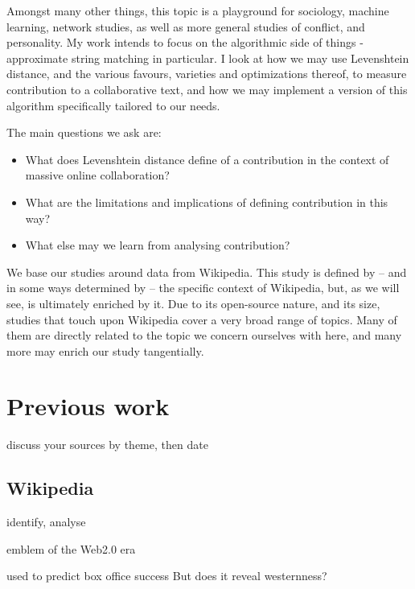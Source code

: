 \documentclass[a4paper,11pt,twoside,notitlepage]{article}
\begin{document}
        Amongst many other things, this topic is a playground for
        sociology, machine learning, network studies, as well as more
        general studies of conflict, and personality. My work intends
        to focus on the algorithmic side of things - approximate
        string matching in particular. I look at how we may use
        Levenshtein distance, and the various favours,
        varieties and optimizations thereof, to measure contribution
        to a collaborative text, and how we may implement a version of
        this algorithm specifically tailored to our needs.

        The main questions we ask are:
        \begin{itemize}
          \item What does Levenshtein distance define of a
            contribution in the context of massive online
            collaboration?
          \item What are the limitations and implications of defining
            contribution in this way?
          \item What else may we learn from analysing contribution? 
        \end{itemize}

        We base our studies around data from Wikipedia. This study is
        defined by -- and in some ways determined by -- the specific
        context of Wikipedia, but, as we will see, is ultimately
        enriched by it. Due to its open-source nature, and its size,
        studies that touch upon Wikipedia cover a very broad range of
        topics. Many of them are directly related to the topic we
        concern ourselves with here, and many more may enrich our
        study tangentially. 
 
        \section{Previous work}
        discuss your sources
        by theme, then date

        \subsection{Wikipedia}
        identify, analyse

        emblem of the Web2.0 era \cite{Mesgari2014}

        used to predict box office success \cite{Mestyan2012} But does
        it reveal westernness?
\end{document}

